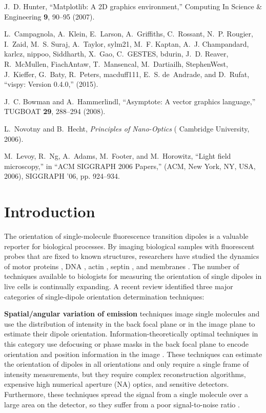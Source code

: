 \documentclass[10pt]{article}
\begin{document}
\begin{thebibliography}{10}
J.~D. Hunter, \enquote{Matplotlib: A {2D} graphics environment,} Computing In
  Science \& Engineering \textbf{9}, 90--95 (2007).

L.~Campagnola, A.~Klein, E.~Larson, A.~Griffiths, C.~Rossant, N.~P. Rougier,
  I.~Zaid, M.~S. Suraj, A.~Taylor, sylm21, M.~F. Kaptan, A.~J. Champandard,
  karlcz, nippoo, Siddharth, X.~Gao, C.~GESTES, bdurin, J.~D. Reaver,
  R.~McMullen, FiachAntaw, T.~Mansencal, M.~Dartiailh, StephenWest, J.~Kieffer,
  G.~Baty, R.~Peters, macduff111, E.~S. de~Andrade, and D.~Rufat,
  \enquote{vispy: Version 0.4.0,}  (2015).

J.~C. Bowman and A.~Hammerlindl, \enquote{Asymptote: A vector graphics
  language,} TUGBOAT \textbf{29}, 288--294 (2008).

L.~Novotny and B.~Hecht, \emph{Principles of Nano-Optics} (\hypertarget{press}
  {{\color{urlblue}
Cambridge University}}, 2006).

M.~Levoy, R.~Ng, A.~Adams, M.~Footer, and M.~Horowitz, \enquote{Light field
  microscopy,} in \enquote{ACM SIGGRAPH 2006 Papers,}  (ACM, New York, NY, USA,
  2006), SIGGRAPH '06, pp. 924--934.

\end{thebibliography}


\section{Introduction}\label{sec:intro}
The orientation of single-molecule fluorescence transition dipoles is a valuable
reporter for biological processes. By imaging biological samples with
fluorescent probes that are fixed to known structures, researchers have studied
the dynamics of motor proteins \cite{peterman2001, forkey2003}, DNA
\cite{backer2016}, actin \cite{mehta2016}, septin \cite{demay2011,
  mcquilken2017}, and membranes \cite{anantharam2010}. The number of techniques
available to biologists for measuring the orientation of single dipoles in live
cells is continually expanding. A recent review \cite{backlund2014} identified
three major categories of single-dipole orientation determination techniques:

\textbf{Spatial/angular variation of emission} techniques image single molecules
and use the distribution of intensity in the back focal plane \cite{lieb2004} or
in the image plane \cite{backer2014} to estimate their dipole
orientation. Information-theoretically optimal techniques in this category use
defocusing or phase masks in the back focal plane to encode orientation and
position information in the image \cite{agrawal2012}. These techniques can
estimate the orientation of dipoles in all orientations and only require a
single frame of intensity measurements, but they require complex reconstruction
algorithms, expensive high numerical aperture (NA) optics, and sensitive
detectors. Furthermore, these techniques spread the signal from a single
molecule over a large area on the detector, so they suffer from a poor
signal-to-noise ratio \cite{toprak2006}.
\end{document}
